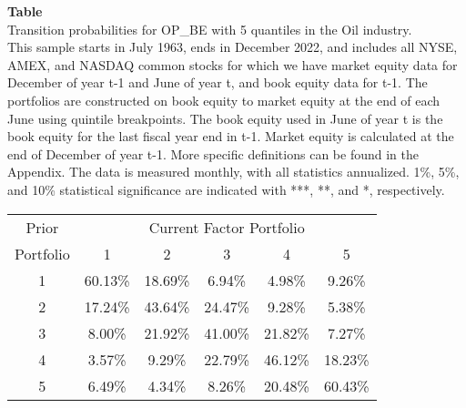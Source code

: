 \begin{table*}[ht!]
\raggedright
{}
\label{tab: transition_probs_OP_BE_Oil_with_5_quantiles}
\textbf{Table \thetable} \\
Transition probabilities for OP_BE with 5 quantiles in the Oil industry. \\
\hspace*{1em}This sample starts in July 1963, ends in December 2022, and includes all NYSE, AMEX, and NASDAQ common stocks for which we have market equity data for December of year t-1 and June of year t, and book equity data for t-1. The portfolios are constructed on book equity to market equity at the end of each June using quintile breakpoints.  The book equity used in June of year t is the book equity for the last fiscal year end in t-1.  Market equity is calculated at the end of December of year t-1.  More specific definitions can be found in the Appendix.  The data is measured monthly, with all statistics annualized.  1\%, 5\%, and 10\% statistical significance are indicated with ***, **, and *, respectively. \\
\vspace{0.5em}
\centering
\begin{adjustbox}{max width=\textwidth}
\begin{tabular}{@{}cccccc@{}}
\toprule
Prior & \multicolumn{5}{c}{Current Factor Portfolio} \\
Portfolio & 1 & 2 & 3 & 4 & 5 \\
\midrule
1 & 60.13\% & 18.69\% & 6.94\% & 4.98\% & 9.26\% \\
2 & 17.24\% & 43.64\% & 24.47\% & 9.28\% & 5.38\% \\
3 & 8.00\% & 21.92\% & 41.00\% & 21.82\% & 7.27\% \\
4 & 3.57\% & 9.29\% & 22.79\% & 46.12\% & 18.23\% \\
5 & 6.49\% & 4.34\% & 8.26\% & 20.48\% & 60.43\% \\
\bottomrule
\end{tabular}
\end{adjustbox}
\end{table*}